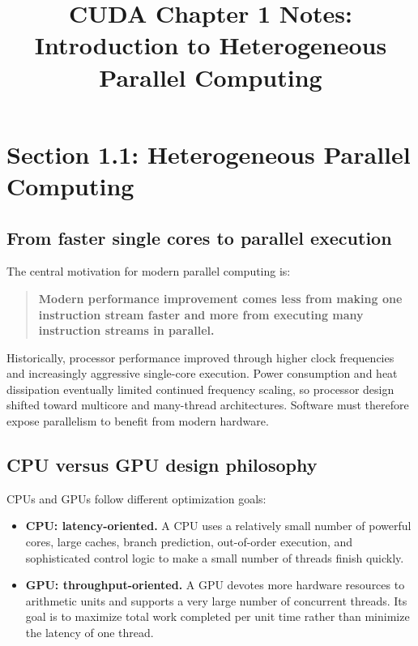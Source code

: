 \documentclass[11pt,a4paper]{article}
\title{CUDA Chapter 1 Notes: Introduction to Heterogeneous Parallel Computing}
\author{}
\date{}
\begin{document}
\maketitle

\section{Section 1.1: Heterogeneous Parallel Computing}

\subsection{From faster single cores to parallel execution}

The central motivation for modern parallel computing is:

\begin{quote}
\textbf{Modern performance improvement comes less from making one instruction stream faster and more from executing many instruction streams in parallel.}
\end{quote}

Historically, processor performance improved through higher clock frequencies and increasingly aggressive single-core execution. Power consumption and heat dissipation eventually limited continued frequency scaling, so processor design shifted toward multicore and many-thread architectures. Software must therefore expose parallelism to benefit from modern hardware.

\subsection{CPU versus GPU design philosophy}

CPUs and GPUs follow different optimization goals:

\begin{itemize}[leftmargin=2em,itemsep=3pt]
    \item \textbf{CPU: latency-oriented.} A CPU uses a relatively small number of powerful cores, large caches, branch prediction, out-of-order execution, and sophisticated control logic to make a small number of threads finish quickly.
    \item \textbf{GPU: throughput-oriented.} A GPU devotes more hardware resources to arithmetic units and supports a very large number of concurrent threads. Its goal is to maximize total work completed per unit time rather than minimize the latency of one thread.
\end{itemize}
\end{document}
